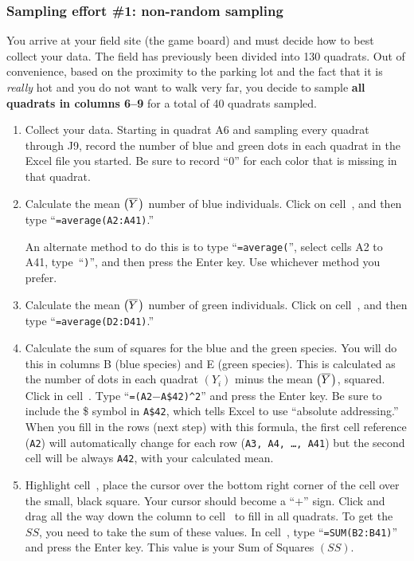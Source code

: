 \documentclass[12pt, hidelinks]{exam}
\newcommand*\meanY{\overline{Y}\kern0.67pt}
\newcommand*\xcell[1]{cell~\liningnum{#1}}
\begin{document}
\subsubsection*{Sampling effort \#1: non-random sampling}

You arrive at your field site (the game board) and must decide
how to best collect your data. The field has previously been divided
into 130 quadrats. Out of convenience, based on the proximity to the
parking lot and the fact that it is \emph{really} hot and you do not want to
walk very far, you decide to sample \textbf{all quadrats in columns 6–9}
for a total of 40 quadrats sampled. 

\begin{enumerate}

\item Collect your data. Starting in quadrat {\liningnum A6} and sampling every quadrat
through {\liningnum J9}, record the number of blue and green dots in each quadrat
in the Excel file you started. Be sure to record “0” for each
color that is missing in that quadrat.


\item Calculate the mean $\left( \meanY \right)$ number of blue individuals. Click on \xcell{A42}, and then type “\texttt{=average(A2:A41)}.”

 An alternate method to do this is to type “\texttt{=average(}”, select cells {\liningnum A2 to A41}, type~“\texttt{)}”, and then press the Enter key. Use whichever method you prefer.

\item Calculate the mean  $\left( \meanY \right)$ number of green individuals. Click on \xcell{D42}, and then type
“\texttt{=average(D2:D41)}.”

\item Calculate the sum of squares for the blue and the green species. You will do this in
columns B (blue species) and E (green species). This is calculated as the number of dots in each quadrat $\left( Y_i \right)$ minus the mean $\left( \meanY \right)$,
squared. Click in \xcell{B2}. Type “\texttt{=(A2$-$A\$42)\textasciicircum2}” and press the Enter key. 
Be sure to include the \$ symbol in \texttt{A\$42}, which tells Excel to use “absolute addressing.” When you fill in the rows (next step) with this formula, the first cell reference (\texttt{A2}) will automatically change for each row (\texttt{A3,\,A4,\,\dots,\,A41}) but the second cell will be always \texttt{A42}, with your calculated mean. 

\item Highlight \xcell{B2}, place the cursor over the bottom right corner of
the cell over the small, black square. Your cursor should become a “$+$”
sign. Click and drag all the way down the column to \xcell{B41} to fill
in all quadrats.  To get the $SS$, you need to take the sum of these
values. In \xcell{B42}, type “\texttt{=SUM(B2:B41)}” and press the Enter key. This value is your Sum of Squares $(SS)$.


\end{enumerate}
\end{document}
